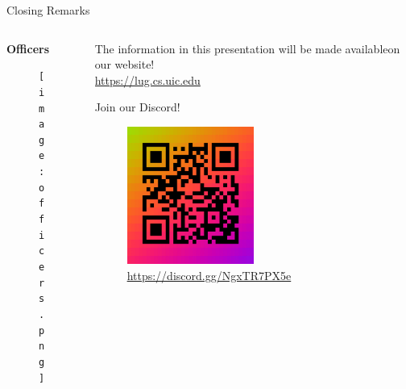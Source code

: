 \documentclass{beamer}
\begin{document}
\begin{frame}{Closing Remarks}
	\begin{columns}
		\begin{column}{0.5\textwidth}
			\textbf{Officers}
			\begin{figure}
				\centering
				\texttt{[image: officers.png]}
			\end{figure}
		\end{column}
		\begin{column}{0.5\textwidth}
			The information in this presentation will be made
			available\footnotemark on our website!\\
			\url{https://lug.cs.uic.edu}
			
			\bigskip
			Join our Discord!

			\begin{figure}
				\centering
				\includegraphics[width=0.5\textwidth]{discord-invite}
				\caption{\scriptsize\url{https://discord.gg/NgxTR7PX5e}}
			\end{figure}
		\end{column}
	\end{columns}

\end{frame}
\end{document}
